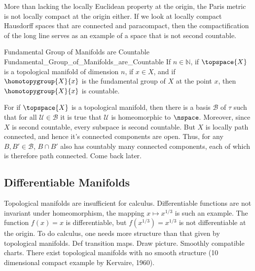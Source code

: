             \begin{example}
                More than lacking the locally Euclidean property at the origin,
                the Paris metric is not locally compact at the origin either.
                If we look at locally compact Hausdorff spaces that are
                connected and paracompact, then the compactification of the long
                line serves as an example of a space that is not second
                countable.
            \end{example}
            \begin{ftheorem}{Fundamental Group of Manifolds are Countable}
                            {Fundamental_Group_of_Manifolds_are_Countable}
                If $n\in\mathbb{N}$, if $\topspace{X}$ is a topological
                manifold of dimension $n$, if $x\in{X}$, and if
                $\homotopygroup{X}{x}$ is the fundamental group of $X$ at the
                point $x$, then $\homotopygroup{X}{x}$ is countable.
            \end{ftheorem}
            \begin{bproof}
                For if $\topspace{X}$ is a topological manifold, then there is a
                basis $\mathcal{B}$ of $\tau$ such that for all
                $\mathcal{U}\in\mathcal{B}$ it is true that $\mathcal{U}$ is
                homeomorphic to $\nspace$. Moreover, since $X$ is second
                countable, every subspace is second countable. But $X$ is
                locally path connected, and hence it's connected components are
                open. Thus, for any $B,B'\in\mathcal{B}$, $B\cap{B}'$ also has
                countably many connected components, each of which is therefore
                path connected. Come back later.
            \end{bproof}
        \subsection{Differentiable Manifolds}
            Topological manifolds are insufficient for calculus. Differentiable
            functions are not invariant under homeomorphism, the mapping
            $x\mapsto{x}^{1/3}$ is such an example. The function $f(x)=x$ is
            differentiable, but $f(x^{1/3})=x^{1/3}$ is not differentiable at
            the origin. To do calculus, one needs more structure than that given
            by topological manifolds. Def transition maps. Draw picture.
            Smoothly compatible charts. There exist topological manifolds with
            no smooth structure (10 dimensional compact example by Kervaire,
            1960).
